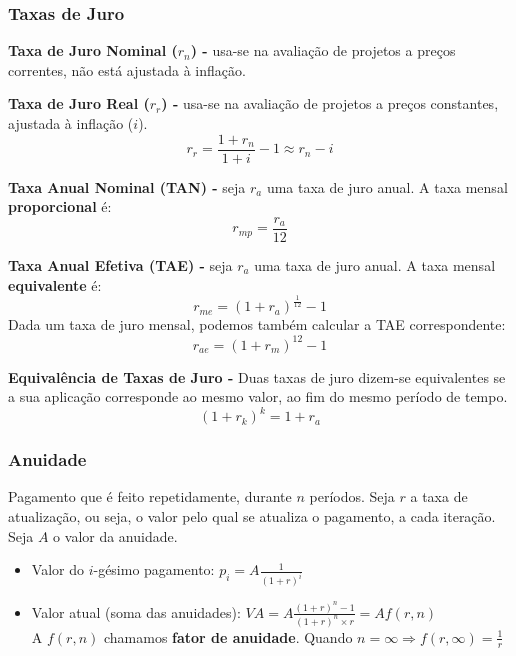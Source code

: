 \documentclass[11pt]{article}
\begin{document}
\subsubsection{Taxas de Juro}

\textbf{Taxa de Juro Nominal ($r_n$) -} usa-se na avaliação de projetos a preços correntes, não está ajustada à inflação.

\textbf{Taxa de Juro Real ($r_r$) -} usa-se na avaliação de projetos a preços constantes, ajustada à inflação ($i$).
\begin{equation*}
    r_r = \frac{1+r_n}{1+i} - 1 \approx r_n - i
\end{equation*}

\textbf{Taxa Anual Nominal (TAN) -} seja $r_a$ uma taxa de juro anual. A taxa mensal \textbf{proporcional} é:
\begin{equation*}
    r_{mp} = \frac{r_a}{12}
\end{equation*}

\textbf{Taxa Anual Efetiva (TAE) -} seja $r_a$ uma taxa de juro anual. A taxa mensal \textbf{equivalente} é:
\begin{equation*}
    \displaystyle r_{me} = (1+r_a)^{\frac{1}{12}} - 1
\end{equation*}
Dada um taxa de juro mensal, podemos também calcular a TAE correspondente:
\begin{equation*}
    \displaystyle r_{ae} = (1+r_m)^{12} - 1
\end{equation*}

\textbf{Equivalência de Taxas de Juro -} Duas taxas de juro dizem-se equivalentes se a sua aplicação corresponde ao mesmo valor, ao fim do mesmo período de tempo.
\begin{equation*}
    (1+r_k)^k = 1 + r_a
\end{equation*}

\subsubsection{Anuidade}

Pagamento que é feito repetidamente, durante $n$ períodos. Seja $r$ a taxa de atualização, ou seja, o valor pelo qual se atualiza o pagamento, a cada iteração. Seja $A$ o valor da anuidade.
\begin{itemize}[topsep=0pt]
    \item Valor do $i$-gésimo pagamento: $\displaystyle p_i=A\frac{1}{(1+r)^i}$
    \item Valor atual (soma das anuidades): $\displaystyle VA=A\frac{(1+r)^n-1}{(1+r)^n\times r}=Af(r,n)$\\[6pt]
          A $f(r,n)$ chamamos \textbf{fator de anuidade}. Quando $\displaystyle n = \infty \Rightarrow f(r,\infty)=\frac{1}{r}$
\end{itemize}
\end{document}
